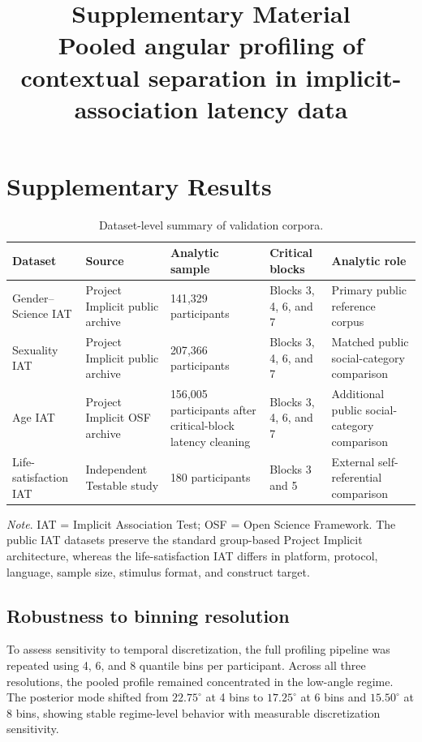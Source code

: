 \documentclass[12pt]{article}
\title{Supplementary Material\\Pooled angular profiling of contextual separation in implicit-association latency data}
\author{}
\date{}
\begin{document}
\maketitle

\section*{Supplementary Results}

\begin{table}[htbp]
\centering
\caption{Dataset-level summary of validation corpora.}
\label{tab:supp-dataset-summary}
\small
\setlength{\tabcolsep}{4pt}
\begin{tabular}{@{}p{3.1cm}p{3.2cm}p{2.5cm}p{2.5cm}p{3.0cm}@{}}
\toprule
Dataset & Source & Analytic sample & Critical blocks & Analytic role \\
\midrule
Gender--Science IAT & Project Implicit public archive & 141{,}329 participants & Blocks 3, 4, 6, and 7 & Primary public reference corpus \\
Sexuality IAT & Project Implicit public archive & 207{,}366 participants & Blocks 3, 4, 6, and 7 & Matched public social-category comparison \\
Age IAT & Project Implicit OSF archive & 156{,}005 participants after critical-block latency cleaning & Blocks 3, 4, 6, and 7 & Additional public social-category comparison \\
Life-satisfaction IAT & Independent Testable study & 180 participants & Blocks 3 and 5 & External self-referential comparison \\
\bottomrule
\end{tabular}

\begin{flushleft}
\footnotesize\emph{Note}. IAT = Implicit Association Test; OSF = Open Science Framework. The public IAT datasets preserve the standard group-based Project Implicit architecture, whereas the life-satisfaction IAT differs in platform, protocol, language, sample size, stimulus format, and construct target.
\end{flushleft}
\end{table}

\subsection*{Robustness to binning resolution}

To assess sensitivity to temporal discretization, the full profiling pipeline was repeated using 4, 6, and 8 quantile bins per participant. Across all three resolutions, the pooled profile remained concentrated in the low-angle regime. The posterior mode shifted from \(22.75^\circ\) at 4 bins to \(17.25^\circ\) at 6 bins and \(15.50^\circ\) at 8 bins, showing stable regime-level behavior with measurable discretization sensitivity.
\end{document}
